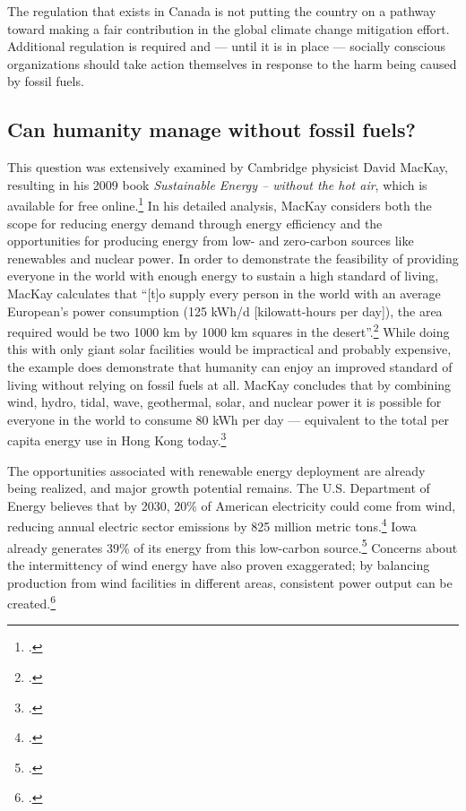 The regulation that exists in Canada is not putting the country on a pathway toward making a fair contribution in the global climate change mitigation effort.
Additional regulation is required and --- until it is in place --- socially conscious organizations should take action themselves in response to the harm being caused by fossil fuels.


	
	\subsection{Can humanity manage without fossil fuels?}
	\label{DoingWithout}



This question was extensively examined by Cambridge physicist David MacKay, resulting in his 2009 book \emph{Sustainable Energy – without the hot air}, which is available for free online.\footcite[][]{MacKay2009}
In his detailed analysis, MacKay considers both the scope for reducing energy demand through energy efficiency and the opportunities for producing energy from low- and zero-carbon sources like renewables and nuclear power.
In order to demonstrate the feasibility of providing everyone in the world with enough energy to sustain a high standard of living, MacKay calculates that ``[t]o supply every person in the world with an average European's power consumption (125 kWh/d [kilowatt-hours per day]), the area required would be two 1000 km by 1000 km squares in the desert''.\footcite[][p. 178]{MacKay2009}
While doing this with only giant solar facilities would be impractical and probably expensive, the example does demonstrate that humanity can enjoy an improved standard of living without relying on fossil fuels at all.
MacKay concludes that by combining wind, hydro, tidal, wave, geothermal, solar, and nuclear power it is possible for everyone in the world to consume 80 kWh per day --- equivalent to the total per capita energy use in Hong Kong today.\footcite[][p. 106, 238]{MacKay2009}



The opportunities associated with renewable energy deployment are already being realized, and major growth potential remains.
The U.S. Department of Energy believes that by 2030, 20\% of American electricity could come from wind, reducing annual electric sector  emissions by 825 million metric tons.\footcite[][]{20PercentBy2030}
Iowa already generates 39\% of its energy from this low-carbon source.\footcite[][]{BlownAway}
Concerns about the intermittency of wind energy have also proven exaggerated; by balancing production from wind facilities in different areas, consistent power output can be created.\footcite[][]{BlownAway}



